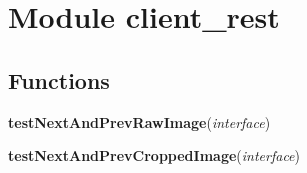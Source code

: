 %
%
%


\section{Module client\_rest}

    \label{client_rest}


  \subsection{Functions}

    \label{client_rest:testNextAndPrevRawImage}

    \vspace{0.5ex}

\hspace{.8\funcindent}\begin{boxedminipage}{\funcwidth}

    \raggedright \textbf{testNextAndPrevRawImage}(\textit{interface})

\setlength{\parskip}{2ex}
\setlength{\parskip}{1ex}
    \end{boxedminipage}

    \label{client_rest:testNextAndPrevCroppedImage}

    \vspace{0.5ex}

\hspace{.8\funcindent}\begin{boxedminipage}{\funcwidth}

    \raggedright \textbf{testNextAndPrevCroppedImage}(\textit{interface})

\setlength{\parskip}{2ex}
\setlength{\parskip}{1ex}
    \end{boxedminipage}

